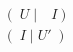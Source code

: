 \documentclass[preview]{standalone}
\begin{document}
\begin{align*}
&(  \;U\; \big| \quad I ) \\ &(\;I \; \big| \; U'\; )
\end{align*}
\end{document}

